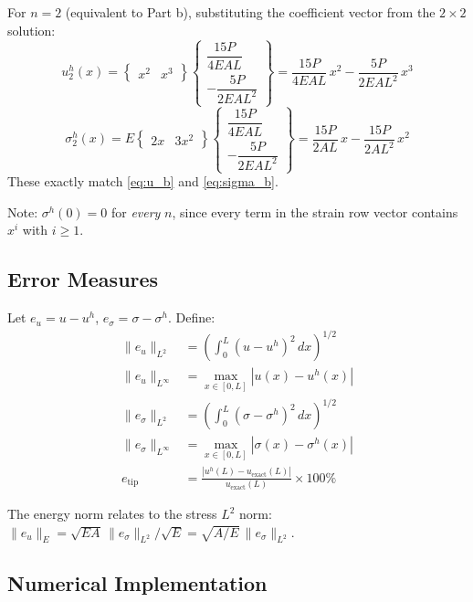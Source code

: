 \documentclass[11pt, a4paper]{article}
\begin{document}
\medskip
For $n=2$ (equivalent to Part b), substituting the coefficient vector from the $2\times 2$ solution:
\[
u^h_2(x) = \begin{Bmatrix} x^2 & x^3 \end{Bmatrix}
\begin{Bmatrix} \dfrac{15P}{4EAL} \\[10pt] -\dfrac{5P}{2EAL^2} \end{Bmatrix}
= \frac{15P}{4EAL}\,x^2 - \frac{5P}{2EAL^2}\,x^3
\]
\[
\sigma^h_2(x) = E \begin{Bmatrix} 2x & 3x^2 \end{Bmatrix}
\begin{Bmatrix} \dfrac{15P}{4EAL} \\[10pt] -\dfrac{5P}{2EAL^2} \end{Bmatrix}
= \frac{15P}{2AL}\,x - \frac{15P}{2AL^2}\,x^2
\]
These exactly match \cref{eq:u_b} and \cref{eq:sigma_b}.

\noindent Note: $\sigma^h(0)=0$ for \emph{every} $n$, since every term in the strain row vector contains
$x^i$ with $i\ge 1$.

\subsection{Error Measures}

Let $e_u=u-u^h$, $e_\sigma=\sigma-\sigma^h$.  Define:
\begin{align}
\|e_u\|_{L^2}    &= \left(\int_0^L (u-u^h)^2\,dx\right)^{1/2} \label{eq:eL2u}\\[4pt]
\|e_u\|_{L^\infty}&= \max_{x\in[0,L]}|u(x)-u^h(x)| \label{eq:eLinfu}\\[4pt]
\|e_\sigma\|_{L^2}&= \left(\int_0^L (\sigma-\sigma^h)^2\,dx\right)^{1/2} \label{eq:eL2s}\\[4pt]
\|e_\sigma\|_{L^\infty}&= \max_{x\in[0,L]}|\sigma(x)-\sigma^h(x)| \label{eq:eLinfs}\\[4pt]
e_{\mathrm{tip}} &= \frac{|u^h(L)-u_{\mathrm{exact}}(L)|}{u_{\mathrm{exact}}(L)}\times 100\%
\label{eq:etip}
\end{align}

The energy norm relates to the stress $L^2$ norm:
$\|e_u\|_E = \sqrt{EA}\,\|e_\sigma\|_{L^2}/\sqrt{E}
= \sqrt{A/E}\,\|e_\sigma\|_{L^2}$.

\subsection{Numerical Implementation}
\end{document}
